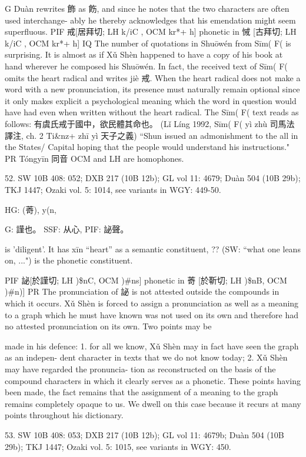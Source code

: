 G Duàn rewrites 飾 as 飭, and since he notes that the two characters are often used interchange- ably he thereby acknowledges that his emendation might seem superfluous.
PIF  戒[居拜切; LH k/iC , OCM kr*+ h] phonetic in 悈 [古拜切; LH k/iC , OCM kr*+ h]
IQ The number of quotations in Shuōwén from Sīm( F( is surprising. It is almost as if Xǔ Shèn happened to have a copy of his book at hand wherever he composed his Shuōwén. In fact, the received text of Sīm( F( omits the heart radical and writes jiè 戒. When the heart radical does not make a word with a new pronunciation, its presence must naturally remain optional since it only makes explicit a psychological meaning which the word in question would have had even when written without the heart radical.
    The Sīm( F( text reads as follows: 有虞氏戒于國中，欲民體其命也。 (Lǐ Líng 1992, Sīm( F( yì zhù 司馬法譯注, ch. 2 Ti&nz+ zhī yì 天子之義) ``Shun issued an admonishment to the all in the States/ Capital hoping that the people would understand his instructions."
PR   Tóngyīn 同音 OCM and LH are homophones.

52. SW 10B 408: 052; DXB 217 (10B 12b); GL vol 11: 4679; Duàn 504 (10B 29b); TKJ 1447; Ozaki vol. 5: 1014, see
variants in WGY: 449-50.

HG:  (䓫), y(n,

G:	謹也。
SSF: 从心,
PIF: 䛑聲。

is 'diligent'.
It has xīn ``heart'' as a semantic constituent,
?? (SW: ``what one leans on, ...") is the phonetic constituent.

PIF   䛑[於謹切; LH )\$nC, OCM )\#ns] phonetic in 䓫 [於靳切; LH )\$nB, OCM )\#n)]
PR The pronunciation of 䛑 is not attested outside the compounds in which it occurs. Xǔ Shèn is forced to assign a pronunciation as well as a meaning to a graph which he must have known was not used on its own and therefore had no attested pronunciation on its own. Two points may be




made in his defence: 1. for all we know, Xǔ Shèn may in fact have seen the graph as an indepen- dent character in texts that we do not know today; 2. Xǔ Shèn may have regarded the pronuncia- tion as reconstructed on the basis of the compound characters in which it clearly serves as a phonetic. These points having been made, the fact remains that the assignment of a meaning to the graph remains completely opaque to us. We dwell on this case because it recurs at many points throughout his dictionary.

53. SW 10B 408: 053; DXB 217 (10B 12b); GL vol 11: 4679b; Duàn 504 (10B 29b); TKJ 1447; Ozaki vol. 5: 1015, see
variants in WGY: 450.


